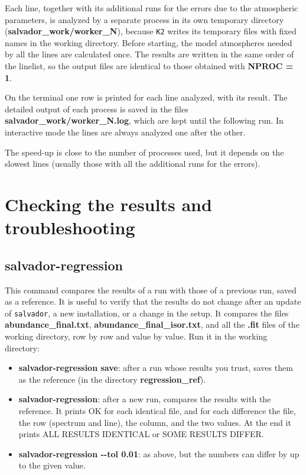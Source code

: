\documentclass[modern]{aastex701}
\begin{document}
Each line, together with its additional runs for the errors due to the atmospheric parameters, is analyzed by a separate process in its own temporary directory ({\bf salvador\_work/worker\_N}), because \texttt{K2} writes its temporary files with fixed names in the working directory. Before starting, the model atmospheres needed by all the lines are calculated once. The results are written in the same order of the linelist, so the output files are identical to those obtained with {\bf NPROC = 1}. 

On the terminal one row is printed for each line analyzed, with its result. The detailed output of each process is saved in the files {\bf salvador\_work/worker\_N.log}, which are kept until the following run. In interactive mode the lines are always analyzed one after the other. 

The speed-up is close to the number of processes used, but it depends on the slowest lines (usually those with all the additional runs for the errors).

\section{Checking the results and troubleshooting} \label{sect:tools}
\hrulefill

\subsection{salvador-regression}
This command compares the results of a run with those of a previous run, saved as a reference. It is useful to verify that the results do not change after an update of \texttt{salvador}, a new installation, or a change in the setup. It compares the files {\bf abundance\_final.txt}, {\bf abundance\_final\_isor.txt}, and all the {\bf .fit} files of the working directory, row by row and value by value. Run it in the working directory:
\begin{itemize}
    \item {\bf salvador-regression save}: after a run whose results you trust, saves them as the reference (in the directory {\bf regression\_ref}).
    \item {\bf salvador-regression}: after a new run, compares the results with the reference. It prints OK for each identical file, and for each difference the file, the row (spectrum and line), the column, and the two values. At the end it prints ALL RESULTS IDENTICAL or SOME RESULTS DIFFER.
    \item {\bf salvador-regression -{}-tol 0.01}: as above, but the numbers can differ by up to the given value.
\end{itemize}
\end{document}
